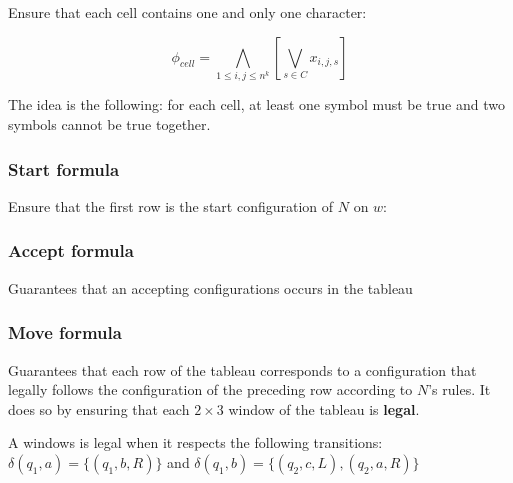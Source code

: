\documentclass[letterpaper]{article}
\begin{document}
Ensure that each cell contains one and only one character:

$$
\phi_{cell} = \bigwedge_{1 \le i, j \le n^k}[\bigvee_{s \in C} x_{i, j, s}]
$$

The idea is the following: for each cell, at least one symbol must be true
and two symbols cannot be true together.

\subsubsection{Start formula}

Ensure that the first row is the start configuration of $N$ on $w$:

\subsubsection{Accept formula}

Guarantees that an accepting configurations occurs in the tableau

\subsubsection{Move formula}

Guarantees that each row of the tableau corresponds to a configuration
that legally follows the configuration of the preceding row according to
$N$'s rules. It does so by ensuring that each $2 \times 3$ window of the
tableau is \textbf{legal}.

A windows is legal when it respects the following transitions:
$\delta(q_1, a) = \{(q_1, b, R)\}$
and $\delta(q_1, b) = \{(q_2, c, L), (q_2, a, R)\}$
\end{document}
